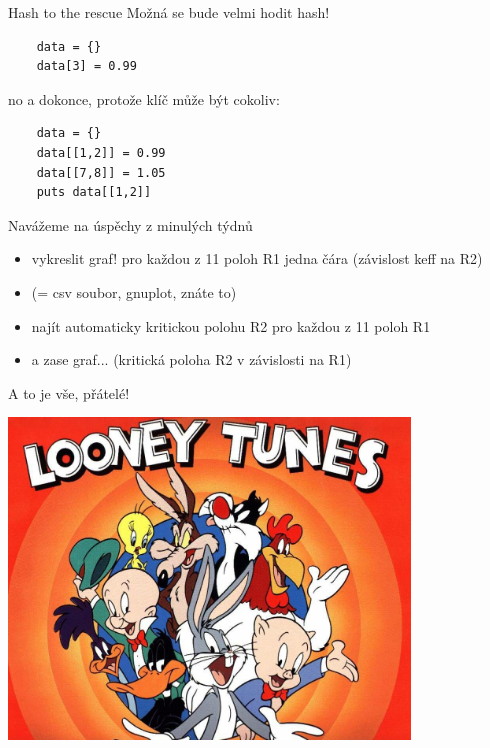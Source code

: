 \documentclass{beamer}
\begin{document}
\begin{frame}[fragile]{Hash to the rescue}
  Možná se bude velmi hodit hash!
  {\scriptsize
  \begin{verbatim}
    data = {}
    data[3] = 0.99
  \end{verbatim}
  }
  no a dokonce, protože klíč může být cokoliv:
  {\scriptsize
  \begin{verbatim}
    data = {}
    data[[1,2]] = 0.99
    data[[7,8]] = 1.05
    puts data[[1,2]]
  \end{verbatim}
  }
\end{frame}

\begin{frame}{Navážeme na úspěchy z minulých týdnů}
  \begin{itemize}
    \item vykreslit graf! pro každou z 11 poloh R1 jedna čára (závislost keff na R2)
    \item (= csv soubor, gnuplot, znáte to)
    \item najít automaticky kritickou polohu R2 pro každou z 11 poloh R1
    \item a zase graf... (kritická poloha R2 v závislosti na R1)
  \end{itemize}
\end{frame}

\begin{frame}{A to je vše, přátelé!}
  \begin{center}
    \includegraphics[width=0.8\textwidth]{looney_tunes}
  \end{center}
\end{frame}
\end{document}
